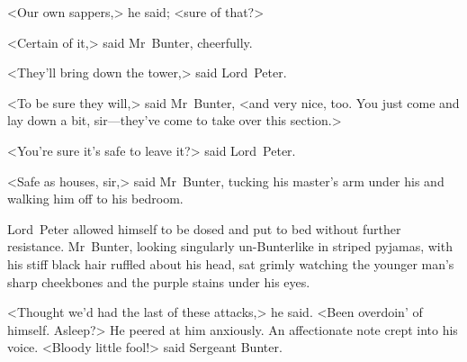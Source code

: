 <Our own sappers,> he said; <sure of that?>

<Certain of it,> said Mr~Bunter, cheerfully.

<They'll bring down the tower,> said Lord~Peter.

<To be sure they will,> said Mr~Bunter, <and very nice, too. You just come and lay down a bit, sir—they've come to take over this section.>

<You're sure it's safe to leave it?> said Lord~Peter.

<Safe as houses, sir,> said Mr~Bunter, tucking his master's arm under his and walking him off to his bedroom.

Lord~Peter allowed himself to be dosed and put to bed without further resistance. Mr~Bunter, looking singularly un-Bunterlike in striped pyjamas, with his stiff black hair ruffled about his head, sat grimly watching the younger man's sharp cheekbones and the purple stains under his eyes.

<Thought we'd had the last of these attacks,> he said. <Been overdoin' of himself. Asleep?> He peered at him anxiously. An affectionate note crept into his voice. <Bloody little fool!> said Sergeant Bunter.